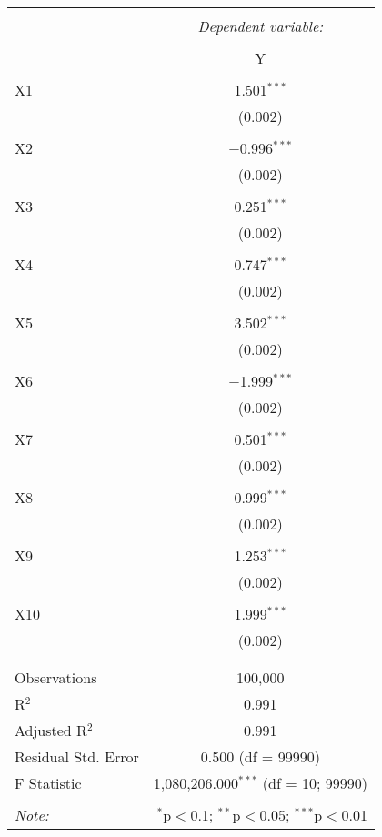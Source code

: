 \documentclass{article}
\begin{document}
\begin{table}[!htbp] \centering 
  \caption{} 
  \label{} 
\begin{tabular}{@{\extracolsep{5pt}}lc} 
\\[-1.8ex]\hline 
\hline \\[-1.8ex] 
 & \multicolumn{1}{c}{\textit{Dependent variable:}} \\ 
\cline{2-2} 
\\[-1.8ex] & Y \\ 
\hline \\[-1.8ex] 
 X1 & 1.501$^{***}$ \\ 
  & (0.002) \\ 
  & \\ 
 X2 & $-$0.996$^{***}$ \\ 
  & (0.002) \\ 
  & \\ 
 X3 & 0.251$^{***}$ \\ 
  & (0.002) \\ 
  & \\ 
 X4 & 0.747$^{***}$ \\ 
  & (0.002) \\ 
  & \\ 
 X5 & 3.502$^{***}$ \\ 
  & (0.002) \\ 
  & \\ 
 X6 & $-$1.999$^{***}$ \\ 
  & (0.002) \\ 
  & \\ 
 X7 & 0.501$^{***}$ \\ 
  & (0.002) \\ 
  & \\ 
 X8 & 0.999$^{***}$ \\ 
  & (0.002) \\ 
  & \\ 
 X9 & 1.253$^{***}$ \\ 
  & (0.002) \\ 
  & \\ 
 X10 & 1.999$^{***}$ \\ 
  & (0.002) \\ 
  & \\ 
\hline \\[-1.8ex] 
Observations & 100,000 \\ 
R$^{2}$ & 0.991 \\ 
Adjusted R$^{2}$ & 0.991 \\ 
Residual Std. Error & 0.500 (df = 99990) \\ 
F Statistic & 1,080,206.000$^{***}$ (df = 10; 99990) \\ 
\hline 
\hline \\[-1.8ex] 
\textit{Note:}  & \multicolumn{1}{r}{$^{*}$p$<$0.1; $^{**}$p$<$0.05; $^{***}$p$<$0.01} \\ 
\end{tabular} 
\end{table} 
\end{document}

